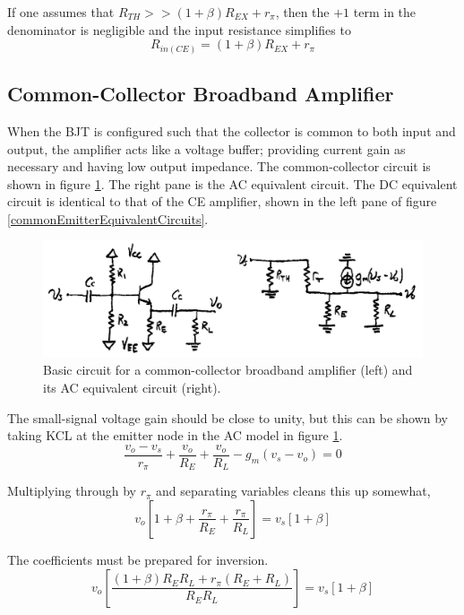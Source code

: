 \documentclass[titlepage, letterpaper, 10.5pt]{article}
\begin{document}
If one assumes that $R_{TH}>>(1+\beta)R_{EX}+r_{\pi}$, then the
$+1$ term in the denominator is negligible and the input resistance
simplifies to
\begin{equation}
R_{in(CE)}=(1+\beta)R_{EX}+r_{\pi}
\label{ceRin}
\end{equation}

\subsection{Common-Collector Broadband Amplifier}

When the BJT is configured such that the collector is common to both
input and output, the amplifier acts like a voltage buffer; providing
current gain as necessary and having low output impedance. The
common-collector circuit is shown in figure
\ref{commonCollectorAmplifier}. The right pane is the AC equivalent
circuit. The DC equivalent circuit is identical to that of the CE
amplifier, shown in the left pane of figure
\ref{commonEmitterEquivalentCircuits}.

\begin{figure}[ht]
	\centering
	\includegraphics[width=.75\textwidth]
		{figures/commonCollectorAmplifier.png}
	\caption{
		Basic circuit for a common-collector broadband amplifier
		(left) and its AC equivalent circuit (right).
	}
	\label{commonCollectorAmplifier}
\end{figure}

The small-signal voltage gain should be close to unity, but this can
be shown by taking KCL at the emitter node in the AC model in figure
\ref{commonCollectorAmplifier}.
\begin{equation*}
\frac{v_{o}-v_{s}}{r_{\pi}}+\frac{v_{o}}{R_{E}}+\frac{v_{o}}{R_{L}}
-g_{m}(v_{s}-v_{o})=0
\end{equation*}

Multiplying through by $r_{\pi}$ and separating variables cleans this
up somewhat,
\begin{equation*}
v_{o}\left[1+\beta+\frac{r_{\pi}}{R_{E}}+\frac{r_{\pi}}{R_{L}}\right]
=v_{s}[1+\beta]
\end{equation*}

The coefficients must be prepared for inversion.
\begin{equation*}
v_{o}\left[\frac{(1+\beta)R_{E}R_{L}+r_{\pi}(R_{E}+R_{L})}
{R_{E}R_{L}}\right]=
v_{s}[1+\beta]
\end{equation*}
\end{document}
